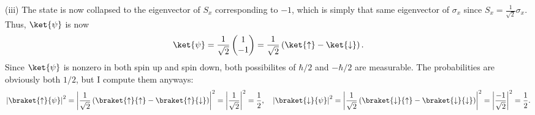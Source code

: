 \documentclass[11pt, letterpaper]{article}
\begin{document}
(iii) The state is now collapsed to the eigenvector of $S_x$ corresponding to $-1$, which is simply that same eigenvector of $\sigma _x$ since $S_x = \frac{1}{\sqrt{2} } \sigma _x$. Thus, $\ket{\psi }$ is now
\[
	\ket{\psi }=\frac{1}{\sqrt{2} } \begin{pmatrix}
	1 \\
	-1
\end{pmatrix}= \frac{1}{\sqrt{2} } \left( \ket{\uparrow}-\ket{\downarrow} \right) 
.\]
Since $\ket{\psi }$ is nonzero in both spin up and spin down, both possibilites of $\hbar/2$ and $-\hbar/2$ are measurable. The probabilities are obviously both $1/2$, but I compute them anyways:
\[
	\left| \braket{\uparrow}{\psi } \right| ^2=\left| \frac{1}{\sqrt{2} } \left( \braket{\uparrow}{\uparrow}-\braket{\uparrow}{\downarrow} \right)  \right| ^2=\left| \frac{1}{\sqrt{2} }  \right| ^2=\frac{1}{2} ,\quad \left| \braket{\downarrow}{\psi } \right| ^2=\left| \frac{1}{\sqrt{2} } \left( \braket{\downarrow}{\uparrow}-\braket{\downarrow}{\downarrow} \right)  \right| ^2=\left| \frac{-1}{\sqrt{2} }  \right| ^2=\frac{1}{2} 
.\]
\end{document}
